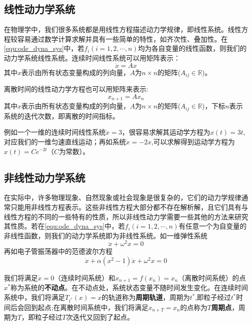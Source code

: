 \subsection{线性动力学系统}
在物理学中，我们很多系统都是用线性方程描述动力学规律，即线性系统。线性方程较容易通过数学计算求解并具有一些简单的特性，如齐次性、叠加性。在\eqref{equ:ode_dyna_sys}中，若$f_i(i=1,2,\cdots,n)$均为各自变量的线性函数，则我们的动力学系统线性系统。连续时间线性系统可以用矩阵表示：
\begin{equation}
    \dot{x}=Ax
\end{equation}
其中$x$表示由所有状态变量构成的列向量，$A$为$n\times n$的矩阵($A_{ij}\in\mathbb{R}$)。

离散时间的线性动力学方程也可以用矩阵来表示:
\begin{equation}
    x_{n+1}=Ax_n
\end{equation}
其中$x$表示由所有状态变量构成的列向量，$A$为$n\times n$的矩阵($A_{ij}\in\mathbb{R}$)，下标$n$表示系统的迭代次数，即离散的时间指标。

例如一个一维的连续时间线性系统$\dot{x}=3$，很容易求解其运动学方程为$x(t)=3t$,对应我们的一维匀速直线运动；再如系统$\dot{x}=-2x$,可以求解得到运动学方程为$x(t)=Ce^{-2t}$（$C$为常数）。

\subsection{非线性动力学系统}
在实际中，许多物理现象、自然现象或社会现象是很复杂的，它们的动力学规律通常只能用非线性方程表示。这些非线性方程大部分都不存在解析解，且它们具有与线性方程的不同的一些特有的性质，所以非线性动力学需要一些其他的方法来研究其性质。若在\eqref{equ:ode_dyna_sys}中，若$f_i(i=1,2,\cdots,n)$有任意一个为自变量的非线性函数，则我们的动力学系统即为非线性系统。如一维弹性系统
\begin{equation}
    \ddot{x}+\omega^2x=0
\end{equation}
再如电子管振荡器中的范德波尔方程
\begin{equation}
    \ddot{x}+\alpha(x^2-1)\dot{x}+\omega^2x=0
\end{equation}

我们将满足$\dot{x}=0$（连续时间系统）和$x_{n+1}=f(x_n)=x_n$（离散时间系统）的点$x^*$称为系统的\textbf{不动点}。在不动点处，系统状态变量不随时间发生变化。在连续时间系统中，我们将满足$T_{t^*}(x)=x$的轨道称为\textbf{周期轨道}，周期为$t^*$,即粒子经过$t^*$时间后会回到起点;在离散时间系统中，我们将满足$x_{n+T}=x_n$的点称为\textbf{$T$周期点}，周期为$T$，即粒子经过$T$次迭代又回到了起点。

